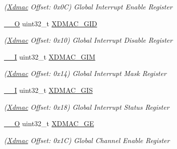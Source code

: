 \begin{DoxyCompactItemize}
\begin{DoxyCompactList}\small\item\em (\mbox{\hyperlink{structXdmac}{Xdmac}} Offset\+: 0x0C) Global Interrupt Enable Register \end{DoxyCompactList}\item 
\mbox{\label{structXdmac_a6f3414e30f46a0bcdcd34f1e978d5e44}} 
\mbox{\hyperlink{core__cm7_8h_a7e25d9380f9ef903923964322e71f2f6}{\+\_\+\+\_\+O}} uint32\+\_\+t \mbox{\hyperlink{structXdmac_a6f3414e30f46a0bcdcd34f1e978d5e44}{X\+D\+M\+A\+C\+\_\+\+G\+ID}}
\begin{DoxyCompactList}\small\item\em (\mbox{\hyperlink{structXdmac}{Xdmac}} Offset\+: 0x10) Global Interrupt Disable Register \end{DoxyCompactList}\item 
\mbox{\label{structXdmac_a2933c65231fe443c5841b815431f2973}} 
\mbox{\hyperlink{core__cm7_8h_af63697ed9952cc71e1225efe205f6cd3}{\+\_\+\+\_\+I}} uint32\+\_\+t \mbox{\hyperlink{structXdmac_a2933c65231fe443c5841b815431f2973}{X\+D\+M\+A\+C\+\_\+\+G\+IM}}
\begin{DoxyCompactList}\small\item\em (\mbox{\hyperlink{structXdmac}{Xdmac}} Offset\+: 0x14) Global Interrupt Mask Register \end{DoxyCompactList}\item 
\mbox{\label{structXdmac_af51090999592b6d9ac927c1939156de1}} 
\mbox{\hyperlink{core__cm7_8h_af63697ed9952cc71e1225efe205f6cd3}{\+\_\+\+\_\+I}} uint32\+\_\+t \mbox{\hyperlink{structXdmac_af51090999592b6d9ac927c1939156de1}{X\+D\+M\+A\+C\+\_\+\+G\+IS}}
\begin{DoxyCompactList}\small\item\em (\mbox{\hyperlink{structXdmac}{Xdmac}} Offset\+: 0x18) Global Interrupt Status Register \end{DoxyCompactList}\item 
\mbox{\label{structXdmac_a888fd4e1cd3a0f250e5908e1fba0268c}} 
\mbox{\hyperlink{core__cm7_8h_a7e25d9380f9ef903923964322e71f2f6}{\+\_\+\+\_\+O}} uint32\+\_\+t \mbox{\hyperlink{structXdmac_a888fd4e1cd3a0f250e5908e1fba0268c}{X\+D\+M\+A\+C\+\_\+\+GE}}
\begin{DoxyCompactList}\small\item\em (\mbox{\hyperlink{structXdmac}{Xdmac}} Offset\+: 0x1C) Global Channel Enable Register \end{DoxyCompactList}\item 

\end{DoxyCompactItemize}
